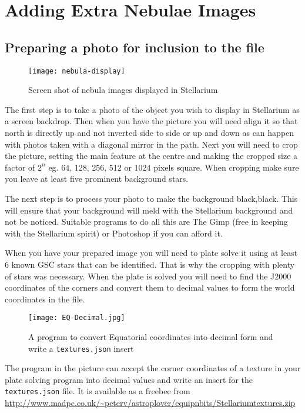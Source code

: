 \section{Adding Extra Nebulae Images}%
\label{sec:dso:adding_images}

\subsection{\texorpdfstring{Preparing a photo for inclusion to the  file}{Preparing a photo for inclusion to the textures.json file}}
\label{sec:dso:preparing-a-photo}

\begin{figure}[h]
\centering\texttt{[image: nebula-display]}
\caption{Screen shot of nebula images displayed in Stellarium}
\end{figure}

The first step is to take a photo of the object you wish to display in
Stellarium as a screen backdrop. Then when you have the picture you will
need align it so that north is directly up and not inverted side to side
or up and down as can happen with photos taken with a diagonal mirror in
the path. Next you will need to crop the picture, setting the main
feature at the centre and making the cropped size a factor of $2^n$ eg. 64,
128, 256, 512 or 1024 pixels square. When cropping make sure you leave
at least five prominent background stars.

The next step is to process your photo to make the background
black,black. This will ensure that your background will meld with the
Stellarium background and not be noticed. Suitable programs to do all
this are The Gimp (free in keeping with the Stellarium spirit) or
Photoshop if you can afford it.

When you have your prepared image you will need to plate solve it using
at least 6 known GSC stars that can be identified. That is why the
cropping with plenty of stars was necessary. When the plate is solved
you will need to find the J2000 coordinates of the corners and convert
them to decimal values to form the world coordinates in the
 file.

\begin{figure}[h]
\centering\texttt{[image: EQ-Decimal.jpg]}
\caption{A program to convert Equatorial coordinates into decimal
form and write a \texttt{textures.json} insert}
\end{figure}

The program in the picture can accept the corner coordinates of a
texture in your plate solving program into decimal values and write an
insert for the \texttt{textures.json} file. It is available as a freebee
from
\url{http://www.madpc.co.uk/~peterv/astroplover/equipnbits/Stellariumtextures.zip}

